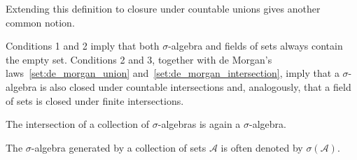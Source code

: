     Extending this definition to closure under countable unions gives another common notion.
    \begin{remark}
        Conditions 1 and 2 imply that both $\sigma$-algebra and fields of sets always contain the empty set. Conditions 2 and 3, together with de Morgan's laws~\eqref{set:de_morgan_union} and~\eqref{set:de_morgan_intersection}, imply that a $\sigma$-algebra is also closed under countable intersections and, analogously, that a field of sets is closed under finite intersections.
    \end{remark}

    \begin{property}[Intersections]
        The intersection of a collection of $\sigma$-algebras is again a $\sigma$-algebra.
    \end{property}

    \begin{notation}\label{set:notation:generated_sigma_algebra}
        The $\sigma$-algebra generated by a collection of sets $\mathcal{A}$ is often denoted by $\sigma(\mathcal{A})$.
    \end{notation}

